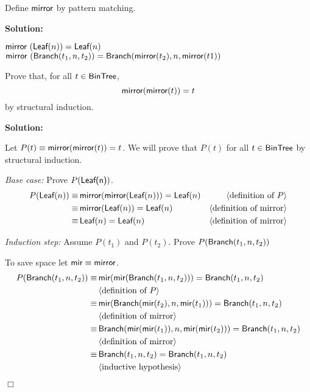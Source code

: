 \documentclass[11pt,fleqn]{article}
\newcommand{\sglsp}{\ }
\newcommand{\mname}[1]{\mbox{\sf #1}}
\newenvironment{proof}{\par\noindent{\bf Proof\sglsp}}{\hfill$\Box$}
\newcommand{\pnote}[1]{{\langle \text{#1} \rangle}}
\begin{document}
    \item Define $\mname{mirror}$ by pattern matching.
    
    \medskip
    \textbf{Solution:}
    \medskip
    
    $\mname{mirror} \ (\mname{Leaf}(n)) = \mname{Leaf}(n)$ \\
    $\mname{mirror} \ (\mname{Branch}(t_1, n, t_2)) = 
    	\mname{Branch}(\mname{mirror}(t_2), n, \mname{mirror}(t1))$ 

    \item Prove that, for all $t \in \mname{BinTree}$,
      \[\mname{mirror}(\mname{mirror}(t)) = t\] by structural
      induction.
      
    \medskip
    \textbf{Solution:}
    \medskip
    
\begin{proof} Let $P(t) \equiv \mname{mirror}(\mname{mirror}(t)) = t$. 
We will prove that $P(t)$ for all $t \in \mname{BinTree}$ by
structural induction.

\medskip

\textit{Base case:} Prove $P(\mname{Leaf(n)})$.
\begin{align*}
P(\mname{Leaf}(n)) \equiv \, & \mname{mirror} (\mname{mirror}(\mname{Leaf}(n))) = \mname{Leaf}(n) & \pnote{definition of $P$} \\
 \equiv \, & \mname{mirror}(\mname{Leaf}(n)) = \mname{Leaf}(n)  & \pnote{definition of mirror}  \\
  \equiv \, & \mname{Leaf}(n) = \mname{Leaf}(n)  & \pnote{definition of mirror}  
\end{align*}

\textit{Induction step:} Assume $P(t_1)$ and $P(t_2)$. Prove
$P(\mname{Branch}(t_1, n, t_2))$

To save space let $\mname{mir} \equiv \mname{mirror}$.
\begin{align*}
P(\mname{Branch}(t_1, n, t_2)) \equiv \, & \mname{mir} (\mname{mir}(\mname{Branch}(t_1, n, t_2))) = \mname{Branch}(t_1, n, t_2) \\ 
& \pnote{definition of $P$} \\
 \equiv \, & \mname{mir}(\mname{Branch}(\mname{mir}(t_2), n, \mname{mir}(t_1))) = \mname{Branch}(t_1, n, t_2)  \\
& \pnote{definition of mirror}  \\
  \equiv \, & \mname{Branch}(\mname{mir}(\mname{mir}(t_1)), n, \mname{mir}(\mname{mir}(t_2))) = \mname{Branch}(t_1, n, t_2)  \\
  & \pnote{definition of mirror}  \\
  \equiv \, & \mname{Branch}(t_1, n, t_2) = \mname{Branch}(t_1, n, t_2)  \\
& \pnote{inductive hypothesis}  
\end{align*}

\end{proof}
\end{document}

